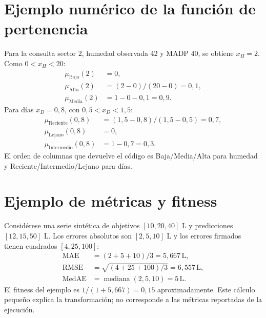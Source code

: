 \documentclass[11pt,letterpaper]{article}
\newcommand{\MAE}{\mathrm{MAE}}
\newcommand{\RMSE}{\mathrm{RMSE}}
\newcommand{\MedAE}{\mathrm{MedAE}}
\begin{document}
\section{Ejemplo numérico de la función de pertenencia}
Para la consulta sector 2, humedad observada 42 y MADP 40, se obtiene $x_H=2$. Como $0<x_H<20$:
\begin{align*}
  \mu_{\mathrm{Baja}}(2)&=0,\\
  \mu_{\mathrm{Alta}}(2)&=(2-0)/(20-0)=0,1,\\
  \mu_{\mathrm{Media}}(2)&=1-0-0,1=0,9.
\end{align*}
Para días $x_D=0,8$, con $0,5<x_D<1,5$:
\begin{align*}
  \mu_{\mathrm{Reciente}}(0,8)&=(1,5-0,8)/(1,5-0,5)=0,7,\\
  \mu_{\mathrm{Lejano}}(0,8)&=0,\\
  \mu_{\mathrm{Intermedio}}(0,8)&=1-0,7=0,3.
\end{align*}
El orden de columnas que devuelve el código es Baja/Media/Alta para humedad y Reciente/Intermedio/Lejano para días.

\section{Ejemplo de métricas y fitness}
Considérese una serie sintética de objetivos $[10,20,40]$ L y predicciones $[12,15,50]$ L. Los errores absolutos son $[2,5,10]$ L y los errores firmados tienen cuadrados $[4,25,100]$:
\begin{align*}
  \MAE &= (2+5+10)/3=5,667\,\mathrm{L},\\
  \RMSE &= \sqrt{(4+25+100)/3}=6,557\,\mathrm{L},\\
  \MedAE &= \operatorname{mediana}(2,5,10)=5\,\mathrm{L}.
\end{align*}
El fitness del ejemplo es $1/(1+5,667)=0,15$ aproximadamente. Este cálculo pequeño explica la transformación; no corresponde a las métricas reportadas de la ejecución.
\end{document}
